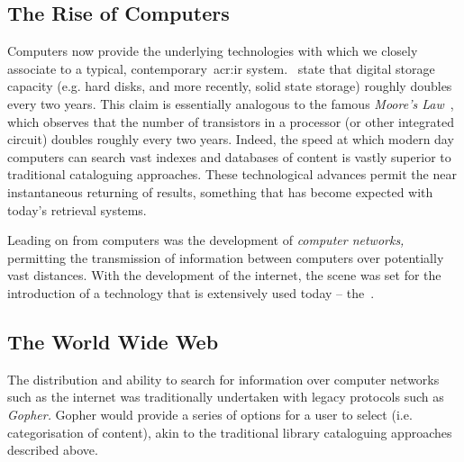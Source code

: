 \subsection{The Rise of Computers}
Computers now provide the underlying technologies with which we closely associate to a typical, contemporary~\gls{acr:ir} system.~\cite{sanderson2012history_of_ir} state that digital storage capacity (e.g. hard disks, and more recently, solid state storage) roughly doubles every two years. This claim is essentially analogous to the famous \emph{Moore's Law}~\citep{moore1965law}, which observes that the number of transistors in a processor (or other integrated circuit) doubles roughly every two years. Indeed, the speed at which modern day computers can search vast indexes and databases of content is vastly superior to traditional cataloguing approaches. These technological advances permit the near instantaneous returning of results, something that has become expected with today's retrieval systems.

Leading on from computers was the development of \emph{computer networks,} permitting the transmission of information between computers over potentially vast distances. With the development of the internet, the scene was set for the introduction of a technology that is extensively used today -- the~.

\subsection{The World Wide Web}
The distribution and ability to search for information over computer networks such as the internet was traditionally undertaken with legacy protocols such as \emph{Gopher.} Gopher would provide a series of options for a user to select (i.e. categorisation of content), akin to the traditional library cataloguing approaches described above.

